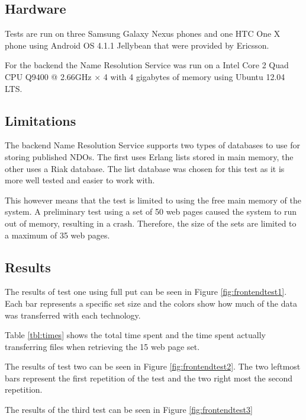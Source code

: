\subsection{Hardware}

Tests are run on three Samsung Galaxy Nexus phones and one HTC One X phone using Android OS 4.1.1 Jellybean that were provided by Ericsson.

For the backend the Name Resolution Service was run on a Intel Core 2 Quad CPU Q9400 @ 2.66GHz × 4 with 4 gigabytes of memory using Ubuntu 12.04 LTS.

\subsection{Limitations}

The backend Name Resolution Service supports two types of databases to use for storing published NDOs. The first uses Erlang lists stored in main memory, the other uses a Riak database. The list database was chosen for this test as it is more well tested and easier to work with.

This however means that the test is limited to using the free main memory of the system. A preliminary test using a set of 50 web pages caused the system to run out of memory, resulting in a crash. Therefore, the size of the sets are limited to a maximum of 35 web pages.

\subsection{Results}




The results of test one using full put can be seen in Figure \ref{fig:frontendtest1}. Each bar represents a specific set size and the colors show how much of the data was transferred with each technology.

Table \ref{tbl:times} shows the total time spent and the time spent actually transferring files when retrieving the 15 web page set.

The results of test two can be seen in Figure \ref{fig:frontendtest2}. The two leftmost bars represent the first repetition of the test and the two right most the second repetition.

The results of the third test can be seen in Figure \ref{fig:frontendtest3}

